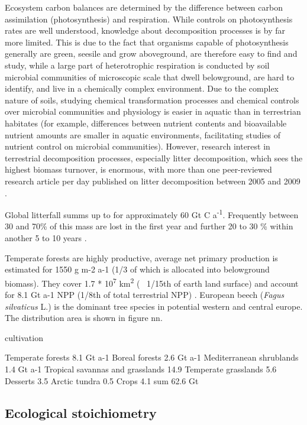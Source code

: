 Ecosystem carbon balances are determined by the difference between carbon assimilation (photosynthesis) and respiration. While controls on photosynthesis rates are well understood, knowledge about decomposition processes is by far more limited. This is due to the fact that organisms capable of photosynthesis generally are green, seesile and grow aboveground, are therefore easy to find and study, while a large part of heterotrophic respiration is conducted by soil microbial communities of microscopic scale that dwell belowground, are  hard to identify, and live in a chemically complex environment. Due to the complex nature of soils, studying chemical transformation processes and chemical controls over microbial communities and physiology is easier in aquatic than in terrestrian habitates (for example, differences between nutrient contents and bioavailable nutrient amounts are smaller in aquatic environments, facilitating studies of nutrient control on microbial communities). However, research interest in terrestrial decomposition processes, especially litter decomposition, which sees the highest biomass turnover, is enormous, with more than one peer-reviewed research article per day published on litter decomposition between 2005 and 2009 \citep{Prescott2010}. 

Global litterfall summs up to for approximately 60 Gt C a\textsuperscript{-1}. Frequently between 30 and 70\% of this mass are lost in the first year and further 20 to 30 \% within another 5 to 10 years \citep[p.157]{Chapin2002}.

Temperate forests are highly productive, average net primary production is estimated for 1550 g m-2 a-1 (1/3 of which is allocated into belowground biomass). They cover 1.7 * 10\textsuperscript{7} km\textsuperscript{2} (~ 1/15th of earth land surface) and account for 8.1 Gt a-1 NPP (1/8th of total terrestrial NPP) \citep[p?]{Chapin2002}. European beech (\emph{Fagus silvaticus} L.) is the dominant tree species in potential western and central europe. The distribution area is shown in figure nn. 

cultivation


Temperate forests 8.1 Gt a-1
Boreal forests 2.6 Gt a-1
Mediterranean shrublands 1.4 Gt a-1
Tropical savannas and grasslands 14.9
Temperate grasslands 5.6
Desserts 3.5
Arctic tundra 0.5 
Crops 4.1
sum 62.6 Gt

\subsection{Ecological stoichiometry}

